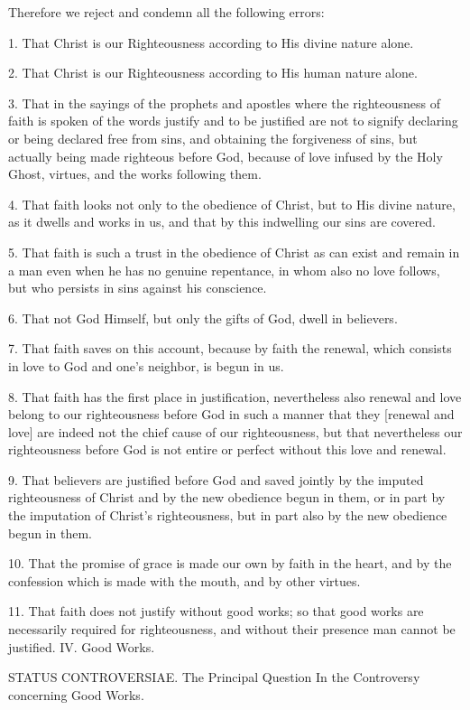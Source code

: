 Therefore we reject and condemn all the following errors:

1. That Christ is our Righteousness according to His divine nature alone.

2. That Christ is our Righteousness according to His human nature alone.

3. That in the sayings of the prophets and apostles where the righteousness of faith is spoken of the words justify and to be justified are not to signify declaring or being declared free from sins, and obtaining the forgiveness of sins, but actually being made righteous before God, because of love infused by the Holy Ghost, virtues, and the works following them.

4. That faith looks not only to the obedience of Christ, but to His divine nature, as it dwells and works in us, and that by this indwelling our sins are covered.

5. That faith is such a trust in the obedience of Christ as can exist and remain in a man even when he has no genuine repentance, in whom also no love follows, but who persists in sins against his conscience.

6. That not God Himself, but only the gifts of God, dwell in believers.

7. That faith saves on this account, because by faith the renewal, which consists in love to God and one's neighbor, is begun in us.

8. That faith has the first place in justification, nevertheless also renewal and love belong to our righteousness before God in such a manner that they [renewal and love] are indeed not the chief cause of our righteousness, but that nevertheless our righteousness before God is not entire or perfect without this love and renewal.

9. That believers are justified before God and saved jointly by the imputed righteousness of Christ and by the new obedience begun in them, or in part by the imputation of Christ's righteousness, but in part also by the new obedience begun in them.

10. That the promise of grace is made our own by faith in the heart, and by the confession which is made with the mouth, and by other virtues.

11. That faith does not justify without good works; so that good works are necessarily required for righteousness, and without their presence man cannot be justified.
IV. Good Works.

STATUS CONTROVERSIAE.
The Principal Question In the Controversy concerning Good Works.

